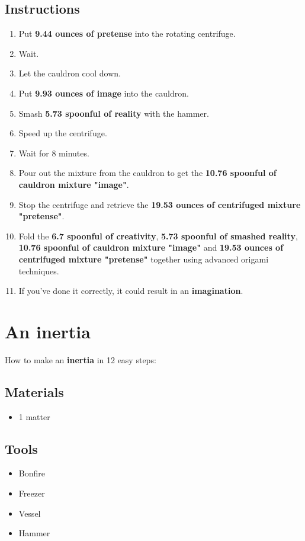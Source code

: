 \documentclass{article}
\begin{document}
\subsection{Instructions}\begin{enumerate}
\item 
Put \textbf{9.44 ounces of pretense} into the rotating centrifuge.
\item 
Wait.
\item 
Let the cauldron cool down.
\item 
Put \textbf{9.93 ounces of image} into the cauldron.
\item 
Smash \textbf{5.73 spoonful of reality} with the hammer.
\item 
Speed up the centrifuge.
\item 
Wait for 8 minutes.
\item 
Pour out the mixture from the cauldron to get the \textbf{10.76 spoonful of cauldron mixture "image"}.
\item 
Stop the centrifuge and retrieve the \textbf{19.53 ounces of centrifuged mixture "pretense"}.
\item 
Fold the \textbf{6.7 spoonful of creativity}, \textbf{5.73 spoonful of smashed reality}, \textbf{10.76 spoonful of cauldron mixture "image"} and \textbf{19.53 ounces of centrifuged mixture "pretense"} together using advanced origami techniques.
\item 
If you've done it correctly, it could result in an \textbf{imagination}.
\end{enumerate}
\newpage
\section{An inertia}How to make an \textbf{inertia} in 12 easy steps:

\subsection{Materials}\begin{itemize}
\item 
1 matter
\end{itemize}
\subsection{Tools}\begin{itemize}
\item 
Bonfire
\item 
Freezer
\item 
Vessel
\item 
Hammer
\end{itemize}
\end{document}
